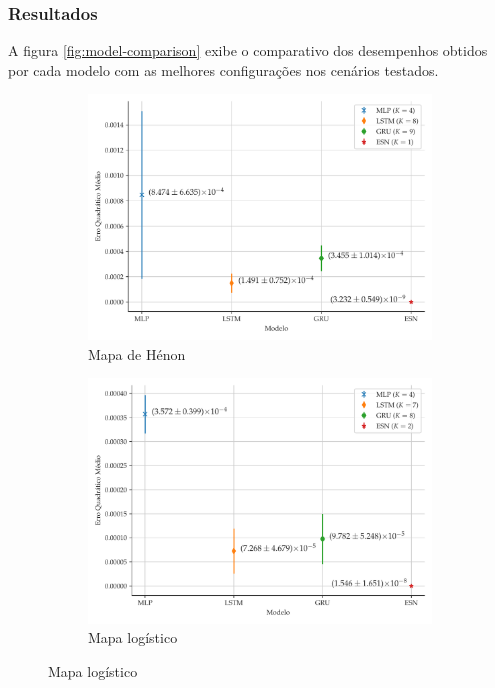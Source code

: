 \documentclass[aspectratio=169]{beamer}
\begin{document}
\begin{frame}
\frametitle{Resultados}
\justifying A figura \ref{fig:model-comparison} exibe o comparativo dos desempenhos obtidos por cada modelo com as melhores configurações nos cenários testados.
\begin{figure}[!h]
     \begin{subfigure}[t]{0.4\textwidth}
     	\centering
         \includegraphics[scale=0.15]{comparacao-k-henon.pdf}
         \caption{Mapa de Hénon}
     \end{subfigure}
     \centering
     \begin{subfigure}[t]{0.4\textwidth} 
     \centering
         \includegraphics[scale=0.15]{comparacao-k-logistic.pdf}
         \caption{Mapa logístico}
     \end{subfigure}

\end{figure}
\end{frame}
\end{document}
